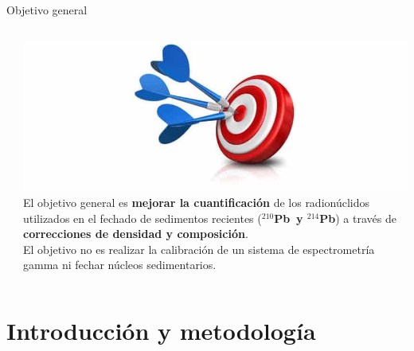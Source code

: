 \documentclass[9pt]{beamer}
\newcommand{\PbCero}{$^{210}$Pb}
\newcommand{\PbCuatro}{$^{214}$Pb}
\begin{document}
\begin{frame}{Objetivo general}
	\begin{columns}
		\begin{column}{0.47\textwidth}
			\justifying

		\end{column}
		\begin{column}{0.47\textwidth}  
			\justifying
			\includegraphics[scale=0.2]{Imagenes/Objetivo.jpg}
			\\
			El objetivo general es \textbf{mejorar la cuantificación} de los radionúclidos utilizados en el fechado de sedimentos recientes (\textbf{\PbCero\, y \PbCuatro}) a través de \textbf{correcciones de densidad y composición}.
			\\ \vspace{0.5cm}
			El objetivo no es realizar la calibración de un sistema de espectrometría gamma ni fechar núcleos sedimentarios.
		\end{column}
	\end{columns}
\end{frame}

\section{Introducción y metodología}
\end{document}
